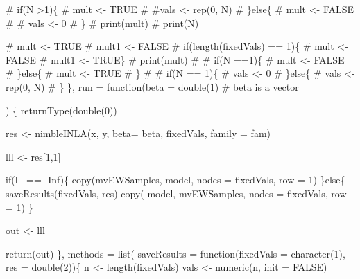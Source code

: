 \documentclass[
]{article}
\newenvironment{Shaded}{\begin{snugshade}}{\end{snugshade}}
\newcommand{\AttributeTok}[1]{\textcolor[rgb]{0.40,0.45,0.13}{#1}}
\newcommand{\CommentTok}[1]{\textcolor[rgb]{0.37,0.37,0.37}{#1}}
\newcommand{\ConstantTok}[1]{\textcolor[rgb]{0.56,0.35,0.01}{#1}}
\newcommand{\ControlFlowTok}[1]{\textcolor[rgb]{0.00,0.23,0.31}{#1}}
\newcommand{\DecValTok}[1]{\textcolor[rgb]{0.68,0.00,0.00}{#1}}
\newcommand{\FunctionTok}[1]{\textcolor[rgb]{0.28,0.35,0.67}{#1}}
\newcommand{\NormalTok}[1]{\textcolor[rgb]{0.00,0.23,0.31}{#1}}
\newcommand{\OtherTok}[1]{\textcolor[rgb]{0.00,0.23,0.31}{#1}}
\newcommand{\SpecialCharTok}[1]{\textcolor[rgb]{0.37,0.37,0.37}{#1}}
\begin{document}
\begin{Shaded}
\begin{Highlighting}[]
    \CommentTok{\#     if(N \textgreater{}1)\{}
    \CommentTok{\#       mult \textless{}{-} TRUE}
    \CommentTok{\#       \#vals \textless{}{-} rep(0, N)}
    \CommentTok{\#     \}else\{}
    \CommentTok{\#       mult \textless{}{-} FALSE}
    \CommentTok{\#      \# vals \textless{}{-} 0}
    \CommentTok{\#     \}}
    \CommentTok{\#     print(mult)}
    \CommentTok{\# print(N)}

    \CommentTok{\# mult \textless{}{-} TRUE}
    \CommentTok{\# mult1 \textless{}{-} FALSE}
    \CommentTok{\# if(length(fixedVals) == 1)\{}
    \CommentTok{\#   mult \textless{}{-} FALSE}
    \CommentTok{\#   mult1 \textless{}{-} TRUE\}}
    \CommentTok{\# print(mult)}
    \CommentTok{\#}
    \CommentTok{\# if(N ==1)\{}
    \CommentTok{\#   mult \textless{}{-} FALSE}
    \CommentTok{\# \}else\{}
    \CommentTok{\#   mult \textless{}{-} TRUE}
    \CommentTok{\# \}}
    \CommentTok{\#}
    \CommentTok{\# if(N == 1)\{}
    \CommentTok{\#   vals \textless{}{-} 0}
    \CommentTok{\# \}else\{}
    \CommentTok{\#   vals \textless{}{-} rep(0, N)}
    \CommentTok{\# \}}
\NormalTok{  \},}
  \AttributeTok{run =} \ControlFlowTok{function}\NormalTok{(}\AttributeTok{beta =} \FunctionTok{double}\NormalTok{(}\DecValTok{1}\NormalTok{) }\CommentTok{\# beta is a vector}

\NormalTok{  ) \{}
    \FunctionTok{returnType}\NormalTok{(}\FunctionTok{double}\NormalTok{(}\DecValTok{0}\NormalTok{))}

\NormalTok{    res }\OtherTok{\textless{}{-}} \FunctionTok{nimbleINLA}\NormalTok{(x, y, }\AttributeTok{beta=}\NormalTok{ beta, fixedVals,  }\AttributeTok{family =}\NormalTok{ fam)}
   

\NormalTok{    lll }\OtherTok{\textless{}{-}}\NormalTok{ res[}\DecValTok{1}\NormalTok{,}\DecValTok{1}\NormalTok{]}

    \ControlFlowTok{if}\NormalTok{(lll }\SpecialCharTok{==} \SpecialCharTok{{-}}\ConstantTok{Inf}\NormalTok{)\{}
      \FunctionTok{copy}\NormalTok{(mvEWSamples, model, }\AttributeTok{nodes =}\NormalTok{ fixedVals, }\AttributeTok{row =} \DecValTok{1}\NormalTok{)}
\NormalTok{    \}}\ControlFlowTok{else}\NormalTok{\{}
      \FunctionTok{saveResults}\NormalTok{(fixedVals, res)}
      \FunctionTok{copy}\NormalTok{( model, mvEWSamples, }\AttributeTok{nodes =}\NormalTok{ fixedVals, }\AttributeTok{row =} \DecValTok{1}\NormalTok{)}
\NormalTok{    \}}

  
\NormalTok{      out }\OtherTok{\textless{}{-}}\NormalTok{ lll}

    \FunctionTok{return}\NormalTok{(out)}
\NormalTok{  \},}
  \AttributeTok{methods =} \FunctionTok{list}\NormalTok{(}
    \AttributeTok{saveResults =} \ControlFlowTok{function}\NormalTok{(}\AttributeTok{fixedVals =} \FunctionTok{character}\NormalTok{(}\DecValTok{1}\NormalTok{),}
                           \AttributeTok{res =} \FunctionTok{double}\NormalTok{(}\DecValTok{2}\NormalTok{))\{}
\NormalTok{      n }\OtherTok{\textless{}{-}} \FunctionTok{length}\NormalTok{(fixedVals)}
\NormalTok{      vals }\OtherTok{\textless{}{-}} \FunctionTok{numeric}\NormalTok{(n, }\AttributeTok{init =} \ConstantTok{FALSE}\NormalTok{)}


\end{Highlighting}
\end{Shaded}
\end{document}
